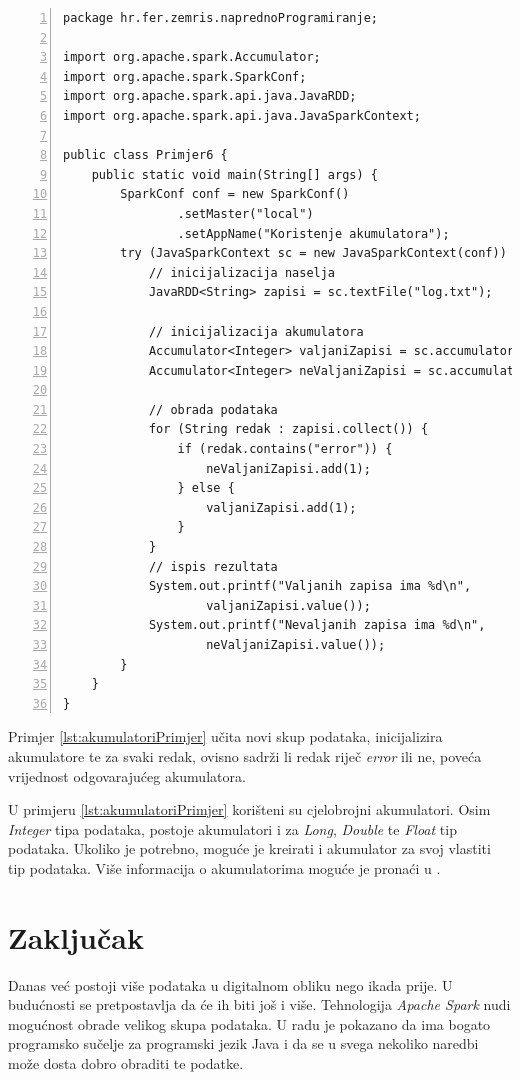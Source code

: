 \documentclass[times, utf8, zavrsni, numeric]{fer}
\begin{document}
\vspace{5mm}
\begin{lstlisting}[numbers=left, label={lst:akumulatoriPrimjer}, caption={Korištenje akumulatora.}, escapechar=|]
package hr.fer.zemris.naprednoProgramiranje;

import org.apache.spark.Accumulator;
import org.apache.spark.SparkConf;
import org.apache.spark.api.java.JavaRDD;
import org.apache.spark.api.java.JavaSparkContext;

public class Primjer6 {
	public static void main(String[] args) {
		SparkConf conf = new SparkConf()
				.setMaster("local")
				.setAppName("Koristenje akumulatora");
		try (JavaSparkContext sc = new JavaSparkContext(conf)) {
			// inicijalizacija naselja
			JavaRDD<String> zapisi = sc.textFile("log.txt");

			// inicijalizacija akumulatora
			Accumulator<Integer> valjaniZapisi = sc.accumulator(0);
			Accumulator<Integer> neValjaniZapisi = sc.accumulator(0);

			// obrada podataka
			for (String redak : zapisi.collect()) {
				if (redak.contains("error")) {
					neValjaniZapisi.add(1);
				} else {
					valjaniZapisi.add(1);
				}
			}
			// ispis rezultata
			System.out.printf("Valjanih zapisa ima %d\n",
					valjaniZapisi.value());
			System.out.printf("Nevaljanih zapisa ima %d\n",
					neValjaniZapisi.value());
		}
	}
}
\end{lstlisting}

Primjer \ref{lst:akumulatoriPrimjer} učita novi skup podataka, inicijalizira akumulatore te za svaki redak, ovisno sadrži li redak riječ \emph{error} ili ne, poveća vrijednost odgovarajućeg akumulatora.

U primjeru \ref{lst:akumulatoriPrimjer} korišteni su cjelobrojni akumulatori. Osim \emph{Integer} tipa podataka, postoje akumulatori i za \emph{Long}, \emph{Double} te \emph{Float} tip podataka. Ukoliko je potrebno, moguće je kreirati i akumulator za svoj vlastiti tip podataka. Više informacija o akumulatorima moguće je pronaći u \cite{workingSets}.
\chapter{Zaključak} 
Danas već postoji više podataka u digitalnom obliku nego ikada prije. U budućnosti se pretpostavlja da će ih biti još i više. Tehnologija \emph{Apache Spark} nudi mogućnost obrade velikog skupa podataka. U radu je pokazano da ima bogato programsko sučelje za programski jezik Java i da se u svega nekoliko naredbi može dosta dobro obraditi te podatke. 
\end{document}
